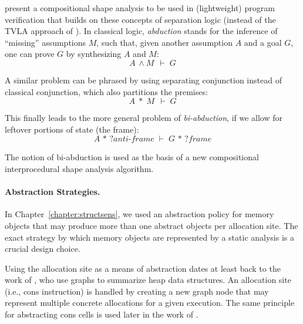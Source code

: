 
\citeauthor{popl/CalcagnoDOY09} present a compositional shape analysis
\cite{popl/CalcagnoDOY09} to be used in (lightweight) program
verification that builds on these concepts of separation logic
(instead of the TVLA approach of \citeauthor{popl/SagivRW99}). In
classical logic, \emph{abduction} stands for the inference of
``missing'' assumptions \(M\), such that, given another assumption
\(A\) and a goal \(G\), one can prove \(G\) by synthesizing \(A\) and
\(M\):
\[A \,\land M\, \;\vdash\; G \]

A similar problem can be phrased by using separating conjunction
instead of classical conjunction, which also partitions the premises:
\[A \;*\; M\, \;\vdash\; G \]

This finally leads to the more general problem of \emph{bi-abduction},
if we allow for leftover portions of state (the frame):
\[A \,*\, \textit{?anti-frame} \;\vdash\; G \,*\, \textit{?frame} \]

The notion of bi-abduction is used as the basis of a new compositional
interprocedural shape analysis algorithm.


\paragraph{Abstraction Strategies.} In Chapter~\ref{chapter:structsens}, we
used an abstraction policy for memory objects that may produce more
than one abstract objects per allocation site. The exact strategy by
which memory objects are represented by a static analysis is a crucial
design choice.

Using the allocation site as a means of abstraction dates at least
back to the work of \citeauthor{popl/JonesM79} \cite{popl/JonesM79},
who use graphs to summarize heap data structures. An allocation site
(i.e., cons instruction) is handled by creating a new graph node that
may represent multiple concrete allocations for a given execution. The
same principle for abstracting cons cells is used later in the work of
\citeauthor*{pldi/ChaseWZ90} \cite{pldi/ChaseWZ90}.

